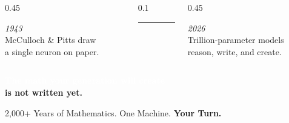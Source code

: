 \documentclass[aspectratio=169,12pt]{beamer}
\begin{document}
\begin{frame}[plain]

  \vspace{0.3cm}
  \begin{columns}[T]
    \begin{column}{0.45\textwidth}
      \begin{center}
        \textcolor{white!80}{\large\itshape 1943}\\[6pt]
        \textcolor{white!90}{\small McCulloch \& Pitts draw\\
          a single neuron on paper.}
      \end{center}
    \end{column}
    \begin{column}{0.1\textwidth}
      \begin{center}
        \vspace{0.5em}
        \textcolor{white!50}{\rule{0.5pt}{3cm}}
      \end{center}
    \end{column}
    \begin{column}{0.45\textwidth}
      \begin{center}
        \textcolor{white!80}{\large\itshape 2026}\\[6pt]
        \textcolor{white!90}{\small Trillion-parameter models\\
          reason, write, and create.}
      \end{center}
    \end{column}
  \end{columns}

  \vspace{1em}
  \begin{center}
    {\Huge\bfseries\textcolor{white}{The math your generation will create}}\\[0.4em]
    {\Huge\bfseries\textcolor{accentOrange}{is not written yet.}}
  \end{center}

  \vspace{1em}
  {\small\centering\textcolor{white!60}{2,000+ Years of Mathematics.
   One Machine. \textbf{Your Turn.}}\par}


\end{frame}
\end{document}

